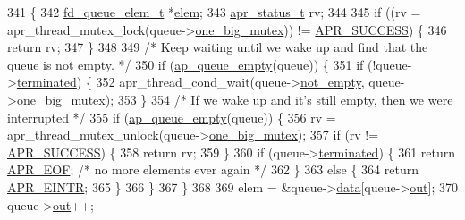 \begin{DoxyCode}
341 \{
342     \hyperlink{structfd__queue__elem__t}{fd\_queue\_elem\_t} *\hyperlink{group__APR__Util__XML_gaf6c0c31c62555e73fa50b02e1393afc2}{elem};
343     \hyperlink{group__apr__errno_gaa5105fa83cc322f09382292db8b47593}{apr\_status\_t} rv;
344 
345     \textcolor{keywordflow}{if} ((rv = apr\_thread\_mutex\_lock(queue->\hyperlink{structfd__queue__t_af029904f6cc5ddc0afec5df2fadeaef6}{one\_big\_mutex})) != 
      \hyperlink{group__apr__errno_ga9ee311b7bf1c691dc521d721339ee2a6}{APR\_SUCCESS}) \{
346         \textcolor{keywordflow}{return} rv;
347     \}
348 
349     \textcolor{comment}{/* Keep waiting until we wake up and find that the queue is not empty. */}
350     \textcolor{keywordflow}{if} (\hyperlink{worker_2fdqueue_8c_af337af05355304aefe574a0ec1739675}{ap\_queue\_empty}(queue)) \{
351         \textcolor{keywordflow}{if} (!queue->\hyperlink{structfd__queue__t_aace4fa4b984ffe25980fed75c97779d2}{terminated}) \{
352             apr\_thread\_cond\_wait(queue->\hyperlink{structfd__queue__t_a18ddd6a916b50d00310ee4ed096a562a}{not\_empty}, queue->\hyperlink{structfd__queue__t_af029904f6cc5ddc0afec5df2fadeaef6}{one\_big\_mutex});
353         \}
354         \textcolor{comment}{/* If we wake up and it's still empty, then we were interrupted */}
355         \textcolor{keywordflow}{if} (\hyperlink{worker_2fdqueue_8c_af337af05355304aefe574a0ec1739675}{ap\_queue\_empty}(queue)) \{
356             rv = apr\_thread\_mutex\_unlock(queue->\hyperlink{structfd__queue__t_af029904f6cc5ddc0afec5df2fadeaef6}{one\_big\_mutex});
357             \textcolor{keywordflow}{if} (rv != \hyperlink{group__apr__errno_ga9ee311b7bf1c691dc521d721339ee2a6}{APR\_SUCCESS}) \{
358                 \textcolor{keywordflow}{return} rv;
359             \}
360             \textcolor{keywordflow}{if} (queue->\hyperlink{structfd__queue__t_aace4fa4b984ffe25980fed75c97779d2}{terminated}) \{
361                 \textcolor{keywordflow}{return} \hyperlink{group__APR__Error_ga35d9dca2514c522a2840aca0f3e2ebd3}{APR\_EOF}; \textcolor{comment}{/* no more elements ever again */}
362             \}
363             \textcolor{keywordflow}{else} \{
364                 \textcolor{keywordflow}{return} \hyperlink{group__APR__Error_gaee1ce306c0ebf1701b34172310aa1bd5}{APR\_EINTR};
365             \}
366         \}
367     \}
368 
369     elem = &queue->\hyperlink{structfd__queue__t_af838c3af6ffee37b30bbe8c45e05292b}{data}[queue->\hyperlink{structfd__queue__t_a85b9339d9c70a03d3ff95ae92061cf70}{out}];
370     queue->\hyperlink{structfd__queue__t_a85b9339d9c70a03d3ff95ae92061cf70}{out}++;

\end{DoxyCode}
